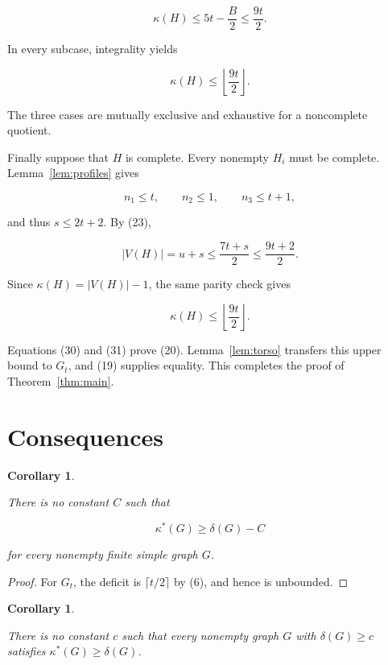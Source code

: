 \documentclass[11pt]{article}
\newtheorem{corollary}[theorem]{Corollary}
\begin{document}
\nopagebreak[4]
\[
\kappa(H)\leq5t-\frac B2\leq\frac{9t}{2}.
\]

In every subcase, integrality yields

\nopagebreak[4]
\[
\kappa(H)\leq\left\lfloor\frac{9t}{2}\right\rfloor.       \tag{30}
\]

The three cases are mutually exclusive and exhaustive for a noncomplete
quotient.

Finally suppose that $H$ is complete. Every nonempty $H_i$ must be complete.
Lemma~\ref{lem:profiles} gives

\nopagebreak[4]
\[
n_1\leq t,
\qquad
n_2\leq1,
\qquad
n_3\leq t+1,
\]

and thus $s\leq2t+2$. By (23),

\nopagebreak[4]
\[
|V(H)|=u+s
\leq\frac{7t+s}{2}
\leq\frac{9t+2}{2}.
\]

Since $\kappa(H)=|V(H)|-1$, the same parity check gives

\nopagebreak[4]
\[
\kappa(H)\leq\left\lfloor\frac{9t}{2}\right\rfloor.       \tag{31}
\]

Equations (30) and (31) prove (20). Lemma~\ref{lem:torso} transfers this upper bound to
$G_t$, and (19) supplies equality. This completes the proof of Theorem~\ref{thm:main}.

\section{Consequences}


\begin{corollary}
\label{cor:unbounded}

There is no constant $C$ such that

\nopagebreak[4]
\[
\kappa^*(G)\geq\delta(G)-C
\]

for every nonempty finite simple graph $G$.

\end{corollary}

\begin{proof}

For $G_t$, the deficit is $\lceil t/2\rceil$ by (6), and hence is unbounded.

\end{proof}


\begin{corollary}
\label{cor:threshold}

There is no constant $c$ such that every nonempty graph $G$ with
$\delta(G)\geq c$
satisfies $\kappa^*(G)\geq\delta(G)$.

\end{corollary}
\end{document}
